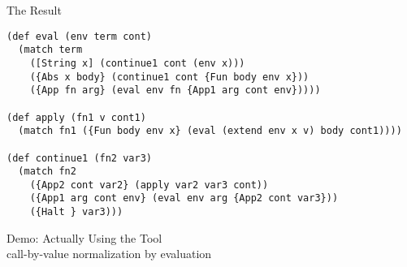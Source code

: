 \documentclass[handout]{beamer}
\newcommand{\LC}{\(\lambda\)-calculus}
\begin{document}
\begin{frame}[fragile]{The Result}
  \begin{lstlisting}
(def eval (env term cont)
  (match term
    ([String x] (continue1 cont (env x)))
    ({Abs x body} (continue1 cont {Fun body env x}))
    ({App fn arg} (eval env fn {App1 arg cont env}))))

(def apply (fn1 v cont1)
  (match fn1 ({Fun body env x} (eval (extend env x v) body cont1))))

(def continue1 (fn2 var3)
  (match fn2
    ({App2 cont var2} (apply var2 var3 cont))
    ({App1 arg cont env} (eval env arg {App2 cont var3}))
    ({Halt } var3)))
  \end{lstlisting}
\end{frame}

\begin{frame}
  \centering
  \LARGE{Demo: Actually Using the Tool}\\
  \small{call-by-value normalization by evaluation}
\end{frame}

\end{document}

